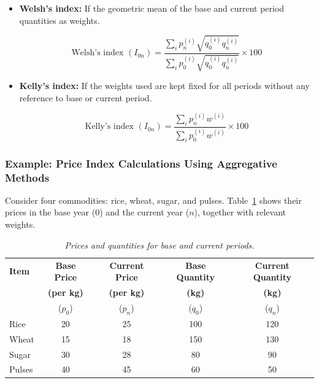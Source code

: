 \documentclass[twoside]{book}
\begin{document}
\begin{itemize}
\item \textbf{Welsh's index:} If the geometric mean of the base and current period quantities as weights.
\begin{textbox}
\begin{equation*}
    \text{Welsh's index } (I_{0n}) = \frac{\displaystyle\sum_i p_n^{(i)} \sqrt{q_0^{(i)}q_n^{(i)}}}{\displaystyle\sum_i p_0^{(i)} \sqrt{q_0^{(i)}q_n^{(i)}}} \times 100
\end{equation*}
\end{textbox}

\item \textbf{Kelly's index:} If the weights used are kept fixed for all periods without any reference to base or current period.
\begin{textbox}
\begin{equation*}
    \text{Kelly's index } (I_{0n}) = \frac{\displaystyle\sum_i p_n^{(i)} w^{(i)}}{\displaystyle\sum_i p_0^{(i)} w^{(i)}} \times 100
\end{equation*}
\end{textbox}

\end{itemize}

\subsubsection{Example: Price Index Calculations Using Aggregative Methods}

Consider four commodities: rice, wheat, sugar, and pulses. Table~\ref{tab:prices_quantities} shows their prices in the base year (0) and the current year ($ n $), together with relevant weights.

\begin{table}[H]
\centering
\begin{tabular}{l|cc|cc}
\toprule
\textbf{Item}    & \textbf{Base Price} & \textbf{Current Price} & \textbf{Base Quantity} & \textbf{Current Quantity} \\
   & \textbf{(per kg)} & \textbf{(per kg)} & \textbf{(kg)} & \textbf{(kg)} \\
    & ($p_0$) & ($p_n$) & ($q_0$) & ($q_n$) \\
\midrule
Rice    & 20             & 25             & 100        & 120 \\
Wheat   & 15             & 18             & 150        & 130\\
Sugar   & 30             & 28             &  80        &  90\\
Pulses  & 40             & 45             &  60        &  50\\
\bottomrule
\end{tabular}
\caption{\textit{Prices and quantities for base and current periods.}}
\label{tab:prices_quantities}
\end{table}
\end{document}
